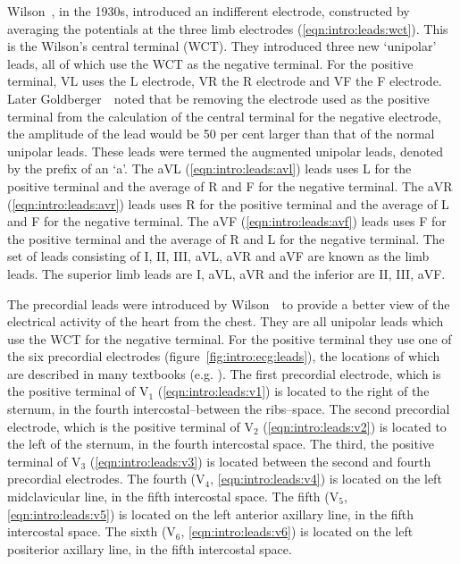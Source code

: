 Wilson~\cite{Wilson1933}, in the 1930s, introduced an indifferent
electrode,  constructed by averaging the potentials at the three limb
electrodes (\ref{eqn:intro:leads:wct}).
This is the Wilson's central terminal (WCT).
They introduced three new `unipolar' leads, all of which use the WCT as the
negative terminal.
For the positive terminal, VL uses the L electrode, VR the R electrode and VF
the F electrode.
Later Goldberger~\cite{Goldberger1942}\ noted that be removing the electrode used
as the positive terminal from the calculation of the central terminal for the
negative electrode, the amplitude of the lead would be 50 per cent larger than
that of the normal unipolar leads.
These leads were termed the augmented unipolar leads, denoted by the prefix of
an `a'.
The aVL (\ref{eqn:intro:leads:avl}) leads uses L for the positive terminal and
the average of R and F for the negative terminal.
The aVR (\ref{eqn:intro:leads:avr}) leads uses R for the positive terminal and
the average of L and F for the negative terminal.
The aVF (\ref{eqn:intro:leads:avf}) leads uses F for the positive terminal and
the average of R and L for the negative terminal.
The set of leads consisting of I, II, III, aVL, aVR and aVF are known as the
limb leads.
The superior limb leads are I, aVL, aVR and the inferior are II, III, aVF.

The precordial leads were introduced by Wilson~\cite{Wilson1944}\ to provide a
better view of the electrical activity of the heart from the chest.
They are all unipolar leads which use the WCT for the negative
terminal.
For the positive terminal they use one of the six precordial electrodes
(figure~\ref{fig:intro:ecg:leads}), the locations of which are described in
many textbooks (e.g.  \cite{Hampton2008}).
The first precordial electrode, which is the positive terminal of
$\text{V}_{\text{1}}$ (\ref{eqn:intro:leads:v1}) is located to the right of the
sternum, in the fourth intercostal--between the ribs--space.
The second precordial electrode, which is the positive terminal of
$\text{V}_{\text{2}}$ (\ref{eqn:intro:leads:v2}) is located to the left of the
sternum, in the fourth intercostal space.
The third, the positive terminal of $\text{V}_{\text{3}}$
(\ref{eqn:intro:leads:v3}) is located between the second and fourth precordial
electrodes.
The fourth ($\text{V}_{\text{4}}$, \ref{eqn:intro:leads:v4}) is located on the
left midclavicular line, in the fifth intercostal space.
The fifth ($\text{V}_{\text{5}}$, \ref{eqn:intro:leads:v5}) is located on the
left anterior axillary line, in the fifth intercostal space.
The sixth ($\text{V}_{\text{6}}$, \ref{eqn:intro:leads:v6}) is located on the
left positerior axillary line, in the fifth intercostal space.

